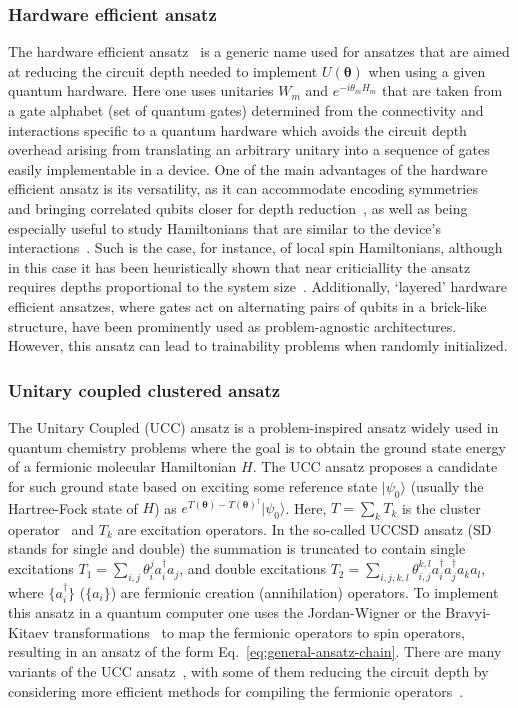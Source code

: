 \documentclass[prx,twocolumn,floatfix,superscriptaddress,longbibliography]{revtex4-1}
\renewcommand{\vec}[1]{\boldsymbol{#1}}  %
\newcommand{\<}{\langle}
\renewcommand{\>}{\rangle}
\newcommand{\ket}[1]{|#1\rangle}               %
\renewcommand{\vec}[1]{\boldsymbol{#1}}  %
\newcommand{\ad}{^\dagger}
\begin{document}
\subsubsection{Hardware efficient ansatz}  The hardware efficient ansatz~\cite{kandala2017hardware} is a generic name used for ansatzes that are aimed at reducing the circuit depth needed to implement $U(\vec{\theta})$ when using a given quantum hardware. Here one uses unitaries $W_m$ and $e^{-i \theta_{m} H_{m}}$ that are taken from a gate alphabet (set of quantum gates) determined from the connectivity and interactions specific to a quantum hardware which avoids the circuit depth overhead arising from  translating an arbitrary unitary into a sequence of gates easily implementable in a device.   One of the main advantages of the hardware efficient ansatz is its versatility, as it can accommodate encoding symmetries~\cite{gard2020efficient,otten2019noise} and bringing correlated qubits closer for depth reduction~\cite{tkachenko2020correlation}, as well as being especially useful to study Hamiltonians that are similar to the device's interactions~\cite{kokail2019self}. Such is the case, for instance, of local spin Hamiltonians, although in this case it has been heuristically shown that  near criticiallity the ansatz requires depths proportional to the system size~\cite{bravo2020scaling}. Additionally, `layered' hardware efficient ansatzes, where gates act on alternating pairs of qubits in a brick-like structure, have been prominently used as problem-agnostic architectures.  However, this ansatz can lead to trainability problems when randomly initialized. 




\subsubsection{Unitary coupled clustered ansatz}  The Unitary Coupled (UCC) ansatz is a problem-inspired ansatz widely used in quantum chemistry problems where the goal is to obtain the ground state energy of a fermionic molecular Hamiltonian $H$.  The UCC ansatz proposes a candidate for such ground state based on  exciting some reference state $\ket{\psi_0}$ (usually the Hartree-Fock state of $H$) as $e^{T(\vec{\theta})-T(\vec{\theta})\ad}\ket{\psi_0}$. Here, $T=\sum_k T_k$ is the cluster operator~\cite{Taube2006ucc,VQE} and $T_k$ are excitation operators. In the so-called UCCSD ansatz (SD stands for single and double) the summation is truncated  to contain single excitations $T_{1}= \sum_{i,j} \theta_{i}^{j} a_{i}^{\dagger} a_{j}$, and double excitations $T_{2}= \sum_{i, j,k,l} \theta_{i, j}^{k,l} a_{i}^{\dagger} a_{j}^{\dagger} a_{k} a_{l}$, where $\{a_i\ad\}$  ($\{a_i\}$)  are fermionic creation (annihilation) operators.  
To implement this ansatz  in a quantum computer one uses the Jordan-Wigner or the Bravyi-Kitaev transformations~\cite{bravyi2002fermionic} to map the fermionic operators to spin operators, resulting in an ansatz of the form Eq.~\eqref{eq:general-ansatz-chain}.
There are many variants of the UCC ansatz~\cite{Lee2019generalized}, with some of them reducing the circuit depth by considering more efficient methods for compiling the fermionic operators~\cite{motta2018low,Matsuzawa2020,kivlichan2018quantum,setia2019superfast}. 
\end{document}
